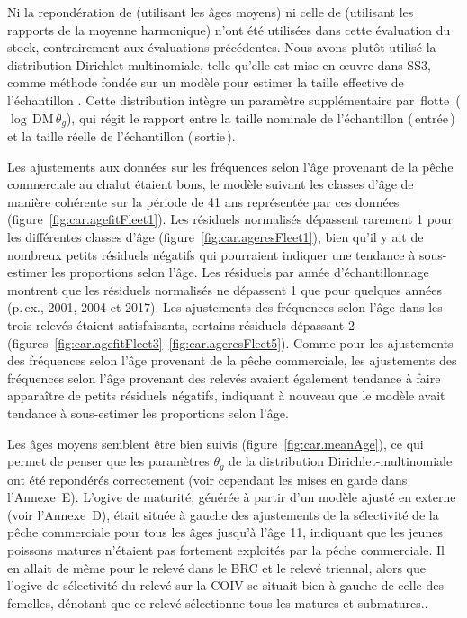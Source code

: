 \documentclass[11pt]{book}
\newcommand{\AppBio}{Annexe~D}
\newcommand{\AppEqn}{Annexe~E}
\newcommand{\angL}{\guillemotleft\,}
\newcommand{\angR}{\,\guillemotright}
\begin{document}
Ni la repond\'{e}ration de \citet{Francis:2011} (utilisant les \^{a}ges moyens) ni celle de \citet{McAllister-Ianelli:1997} (utilisant les rapports de la moyenne harmonique) n'ont \'{e}t\'{e} utilis\'{e}es dans cette \'{e}valuation du stock, contrairement aux \'{e}valuations pr\'{e}c\'{e}dentes.
Nous avons plut\^{o}t utilis\'{e} la distribution Dirichlet-multinomiale, telle qu'elle est mise en {\oe}uvre dans SS3, comme m\'{e}thode fond\'{e}e sur un mod\`{e}le pour estimer la taille effective de l'\'{e}chantillon \citep{Thorson-etal:2017}.
Cette distribution int\`{e}gre un param\`{e}tre suppl\'{e}mentaire par \angL{}flotte\angR{} ($\log\,\text{DM}\,\theta_g$), qui r\'{e}git le rapport entre la taille nominale de l'\'{e}chantillon (\angL{}entr\'{e}e\angR{}) et la taille r\'{e}elle de l'\'{e}chantillon (\angL{}sortie\angR{}).

Les ajustements aux donn\'{e}es sur les fr\'{e}quences selon l'\^{a}ge provenant de la p\^{e}che commerciale au chalut \'{e}taient bons, le mod\`{e}le suivant les classes d'\^{a}ge de mani\`{e}re coh\'{e}rente sur la p\'{e}riode de 41 ans repr\'{e}sent\'{e}e par ces donn\'{e}es (figure~\ref{fig:car.agefitFleet1}).
Les r\'{e}siduels normalis\'{e}s d\'{e}passent rarement 1 pour les diff\'{e}rentes classes d'\^{a}ge (figure~\ref{fig:car.ageresFleet1}), bien qu'il y ait de nombreux petits r\'{e}siduels n\'{e}gatifs qui pourraient indiquer une tendance \`{a} sous-estimer les proportions selon l'\^{a}ge.
Les r\'{e}siduels par ann\'{e}e d'\'{e}chantillonnage montrent que les r\'{e}siduels normalis\'{e}s ne d\'{e}passent 1 que pour quelques ann\'{e}es (p.\,ex., 2001, 2004 et 2017).
Les ajustements des fr\'{e}quences selon l'\^{a}ge dans les trois relev\'{e}s \'{e}taient satisfaisants, certains r\'{e}siduels d\'{e}passant 2 (figures~\ref{fig:car.agefitFleet3}--\ref{fig:car.ageresFleet5}).
Comme pour les ajustements des fr\'{e}quences selon l'\^{a}ge provenant de la p\^{e}che commerciale, les ajustements des fr\'{e}quences selon l'\^{a}ge provenant des relev\'{e}s avaient \'{e}galement tendance \`{a} faire appara\^{i}tre de petits r\'{e}siduels n\'{e}gatifs, indiquant \`{a} nouveau que le mod\`{e}le avait tendance \`{a} sous-estimer les proportions selon l'\^{a}ge.

Les \^{a}ges moyens semblent \^{e}tre bien suivis (figure~\ref{fig:car.meanAge}), ce qui permet de penser que les param\`{e}tres $\theta_g$ de la distribution Dirichlet-multinomiale ont \'{e}t\'{e} repond\'{e}r\'{e}s correctement (voir cependant les mises en garde dans l'\AppEqn).
L'ogive de maturit\'{e}, g\'{e}n\'{e}r\'{e}e \`{a} partir d'un mod\`{e}le ajust\'{e} en externe (voir l'\AppBio), \'{e}tait situ\'{e}e \`{a} gauche des ajustements de la s\'{e}lectivit\'{e} de la p\^{e}che commerciale pour tous les \^{a}ges jusqu'\`{a} l'\^{a}ge 11, indiquant que les jeunes poissons matures n'\'{e}taient pas fortement exploit\'{e}s par la p\^{e}che commerciale.
Il en allait de m\^{e}me pour le relev\'{e} dans le BRC et le relev\'{e} triennal, alors que l'ogive de s\'{e}lectivit\'{e} du relev\'{e} sur la COIV se situait bien \`{a} gauche de celle des femelles, d\'{e}notant que ce relev\'{e} s\'{e}lectionne tous les \SPC matures et submatures..
\end{document}
